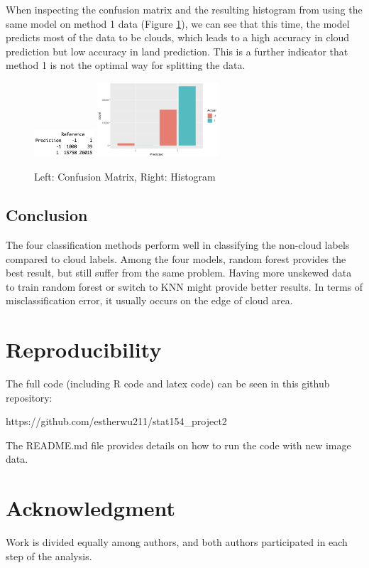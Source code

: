 \documentclass[11pt]{article}
\begin{document}
When inspecting the confusion matrix and the resulting histogram from using the same model on method 1 data (Figure \ref{fig:4-4-1}), we can see that this time, the model predicts most of the data to be clouds, which leads to a high accuracy in cloud prediction but low accuracy in land prediction. This is a further indicator that method 1 is not the optimal way for splitting the data.

\begin{figure}[h]
\includegraphics[width=0.2\textwidth]{4-4-1.jpeg}
\includegraphics[width=0.4\textwidth]{4-4-2.jpeg}
\centering
\caption{Left: Confusion Matrix, Right: Histogram}
\label{fig:4-4-1}
\centering
\end{figure}


\subsection{Conclusion}

The four classification methods perform well in classifying the non-cloud labels compared to cloud labels. Among the four models, random forest provides the best result, but still suffer from the same problem. Having more unskewed data to train random forest or switch to KNN might provide better results. In terms of misclassification error, it usually occurs on the edge of cloud area.  


\section{Reproducibility}

The full code (including R code and latex code) can be seen in this github repository:

https://github.com/estherwu211/stat154\_project2

The README.md file provides details on how to run the code with new image data.


\section{Acknowledgment}
Work is divided equally among authors, and both authors participated in each step of the analysis.
\end{document}
